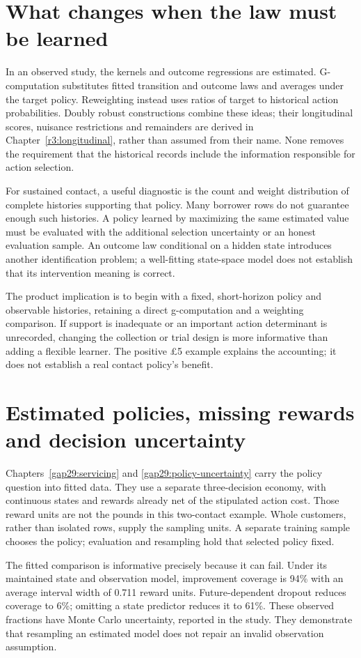 \section{What changes when the law must be learned}
In an observed study, the kernels and outcome regressions are estimated.
G-computation substitutes fitted transition and outcome laws and averages
under the target policy. Reweighting instead uses ratios of target to
historical action probabilities. Doubly robust constructions combine these
ideas; their longitudinal scores, nuisance restrictions and remainders are
derived in Chapter~\ref{r3:longitudinal}, rather than assumed from their
name. None removes the requirement that the historical records include
the information responsible for action selection.

For sustained contact, a useful diagnostic is the count and weight
distribution of complete histories supporting that policy. Many borrower
rows do not guarantee enough such histories. A policy learned by maximizing
the same estimated value must be evaluated with the additional selection
uncertainty or an honest evaluation sample. An outcome law conditional on
a hidden state introduces another identification problem; a well-fitting
state-space model does not establish that its intervention meaning is correct.

The product implication is to begin with a fixed, short-horizon policy and
observable histories, retaining a direct g-computation and a weighting
comparison. If support is inadequate or an important action determinant is
unrecorded, changing the collection or trial design is more informative than
adding a flexible learner. The positive \pounds5 example explains the
accounting; it does not establish a real contact policy's benefit.

\section{Estimated policies, missing rewards and decision uncertainty}
Chapters~\ref{gap29:servicing} and \ref{gap29:policy-uncertainty} carry the
policy question into fitted data. They use a separate three-decision economy,
with continuous states and rewards already net of the stipulated action cost.
Those reward units are not the pounds in this two-contact example. Whole
customers, rather than isolated rows, supply the sampling units. A separate
training sample chooses the policy; evaluation and resampling hold that
selected policy fixed.

The fitted comparison is informative precisely because it can fail.
Under its maintained state and observation model, improvement coverage is
94\% with an average interval width of 0.711 reward units. Future-dependent
dropout reduces coverage to 6\%; omitting a state predictor reduces it to
61\%. These observed fractions have Monte Carlo uncertainty, reported in
the study. They demonstrate that resampling an estimated model does not
repair an invalid observation assumption.


